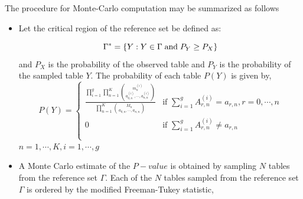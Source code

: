 \documentclass[12pt,oneside]{report}
\theoremstyle{definition}
\theoremstyle{mystyle}
\begin{document}
The procedure for Monte-Carlo computation may be summarized as follows
\begin{itemize}
	
	\item Let the  critical region of the reference set be defined as:
	
	\begin{equation*}
	\Gamma^{*}=\displaystyle \left \{Y:Y \in \Gamma \hspace{1mm}\text{and}\hspace{1mm} P_{Y}\geq P_{X} \right \}
	\end{equation*}
	and $P_{X}$ is the  probability  of the observed table and $P_{Y}$ is the probability of the sampled table $Y$. The probability of each table $P\left(Y\right)$ is given by,\\
	
	\[P\left(Y\right) =\begin{cases}
	\frac{\displaystyle \prod\limits_{i=1}^{g}\prod\limits_{n=1}^{K}\displaystyle \binom {m^{(i)}_{n}}{a^{(i)}_{0,n},\cdots,a^{(i)}_{n,n}}}{\displaystyle\prod\limits_{n=1}^{K}\displaystyle \binom {M_{n}}{a_{0,n},\cdots,a_{n,n}}}&\mbox{if }  \sum \limits_{i=1}^{g}A_{r,n}^{(i)}=a_{r,n},r=0,\cdots,n  \\
	0 & \mbox{if } \sum \limits_{i=1}^{g}A_{r,n}^{(i)} \neq a_{r,n} \\ \\
	\end{cases}
	\]
	$n=1,\cdots,K,i=1,\cdots,g$

	
	
%	
	\item
	  A  Monte Carlo estimate of the $P-value$ is obtained by sampling $N$ tables from the reference set $\Gamma$. Each of the $N$ tables sampled from the reference set $\Gamma$ is ordered by the modified Freeman-Tukey statistic,
	

\end{itemize}
\end{document}
